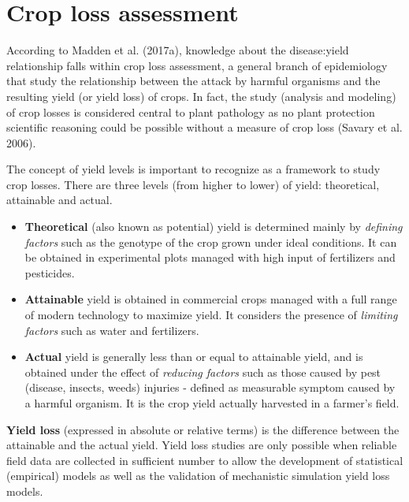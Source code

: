 \documentclass[
  letterpaper,
  DIV=11,
  numbers=noendperiod]{scrreprt}
\providecommand{\tightlist}{%
  \setlength{\itemsep}{0pt}\setlength{\parskip}{0pt}}\usepackage{longtable,booktabs,array}
\begin{document}
\hypertarget{crop-loss-assessment}{%
\section{Crop loss assessment}\label{crop-loss-assessment}}

According to Madden et al. (2017a), knowledge about the disease:yield
relationship falls within crop loss assessment, a general branch of
epidemiology that study the relationship between the attack by harmful
organisms and the resulting yield (or yield loss) of crops. In fact, the
study (analysis and modeling) of crop losses is considered central to
plant pathology as no plant protection scientific reasoning could be
possible without a measure of crop loss (Savary et al. 2006).

The concept of yield levels is important to recognize as a framework to
study crop losses. There are three levels (from higher to lower) of
yield: theoretical, attainable and actual.

\begin{itemize}
\tightlist
\item
  \textbf{Theoretical} (also known as potential) yield is determined
  mainly by \emph{defining factors} such as the genotype of the crop
  grown under ideal conditions. It can be obtained in experimental plots
  managed with high input of fertilizers and pesticides.
\item
  \textbf{Attainable} yield is obtained in commercial crops managed with
  a full range of modern technology to maximize yield. It considers the
  presence of \emph{limiting factors} such as water and fertilizers.
\item
  \textbf{Actual} yield is generally less than or equal to attainable
  yield, and is obtained under the effect of \emph{reducing factors}
  such as those caused by pest (disease, insects, weeds) injuries -
  defined as measurable symptom caused by a harmful organism. It is the
  crop yield actually harvested in a farmer's field.
\end{itemize}

\textbf{Yield loss} (expressed in absolute or relative terms) is the
difference between the attainable and the actual yield. Yield loss
studies are only possible when reliable field data are collected in
sufficient number to allow the development of statistical (empirical)
models as well as the validation of mechanistic simulation yield loss
models.
\end{document}
